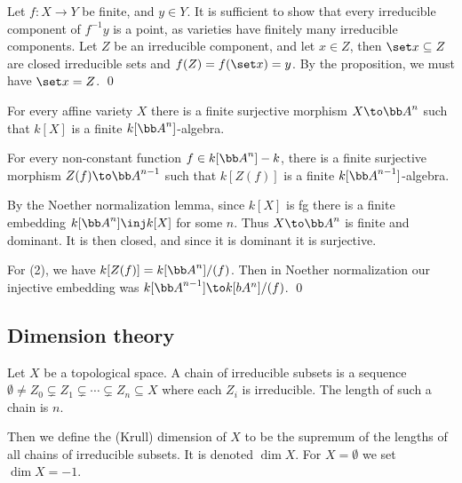 \ecoro

\bproof

    Let $f\colon X\to Y$ be finite, and $y\in Y$.
    It is sufficient to show that every irreducible component of $f^{-1}y$ is a point, as varieties have finitely many irreducible components.
    Let $Z$ be an irreducible component, and let $x\in Z$, then $\set x\subseteq Z$ are closed irreducible sets and $f(Z)=f(\set x)=y$.
    By the proposition, we must have $\set x=Z$.
    \qed

\eproof

\bcoro

    \benum
        \item For every affine variety $X$ there is a finite surjective morphism $X\to\bA^n$ such that $k[X]$ is a finite $k[\bA^n]$-algebra.
        \item For every non-constant function $f\in k[\bA^n]-k$, there is a finite surjective morphism $Z(f)\to\bA^{n-1}$ such that $k[Z(f)]$ is a finite
        $k[\bA^{n-1}]$-algebra.
    \eenum

\ecoro

\bproof

    By the Noether normalization lemma, since $k[X]$ is fg there is a finite embedding $k[\bA^n]\inj k[X]$ for some $n$.
    Thus $X\to\bA^n$ is finite and dominant.
    It is then closed, and since it is dominant it is surjective.

    For (2), we have $k[Z(f)]=k[\bA^n]/(f)$.
    Then in Noether normalization our injective embedding was $k[\bA^{n-1}]\to k[bA^n]/(f)$.
    \qed

\eproof

\subsection{Dimension theory}

\bdefn

    Let $X$ be a topological space.
    A {\emphcolor chain of irreducible subsets} is a sequence $\emptyset\neq Z_0\subsetneq Z_1\subsetneq\cdots\subsetneq Z_n\subseteq X$
    where each $Z_i$ is irreducible.
    The length of such a chain is $n$.

    Then we define the {\emphcolor (Krull) dimension} of $X$ to be the supremum of the lengths of all chains of irreducible subsets.
    It is denoted $\dim X$.
    For $X=\emptyset$ we set $\dim X=-1$.

\edefn

\bnote

